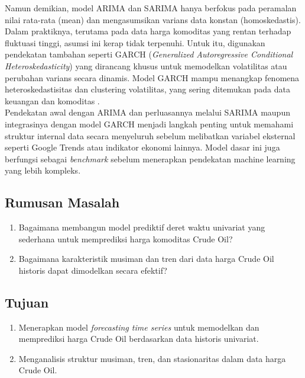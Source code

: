 \documentclass[a4paper,12pt]{article}
\begin{document}
Namun demikian, model ARIMA dan SARIMA hanya berfokus pada peramalan nilai rata-rata (mean) dan mengasumsikan varians data konstan (homoskedastis). Dalam praktiknya, terutama pada data harga komoditas yang rentan terhadap fluktuasi tinggi, asumsi ini kerap tidak terpenuhi. Untuk itu, digunakan pendekatan tambahan seperti GARCH (\textit{Generalized Autoregressive Conditional Heteroskedasticity}) yang dirancang khusus untuk memodelkan volatilitas atau perubahan varians secara dinamis. Model GARCH mampu menangkap fenomena heteroskedastisitas dan clustering volatilitas, yang sering ditemukan pada data keuangan dan komoditas \parencite{engle1982autoregressive}. \\

Pendekatan awal dengan ARIMA dan perluasannya melalui SARIMA maupun integrasinya dengan model GARCH menjadi langkah penting untuk memahami struktur internal data secara menyeluruh sebelum melibatkan variabel eksternal seperti Google Trends atau indikator ekonomi lainnya. Model dasar ini juga berfungsi sebagai \textit{benchmark} sebelum menerapkan pendekatan machine learning yang lebih kompleks.

\subsection{Rumusan Masalah}
\begin{enumerate}
    \item Bagaimana membangun model prediktif deret waktu univariat yang sederhana untuk memprediksi harga komoditas Crude Oil?

    \item Bagaimana karakteristik musiman dan tren dari data harga Crude Oil historis dapat dimodelkan secara efektif?
\end{enumerate}

\subsection{Tujuan}
\begin{enumerate}
    \item Menerapkan model \textit{forecasting time series} untuk memodelkan dan memprediksi harga Crude Oil berdasarkan data historis univariat.

    \item Menganalisis struktur musiman, tren, dan stasionaritas dalam data harga Crude Oil.
\end{enumerate}

\end{document}
